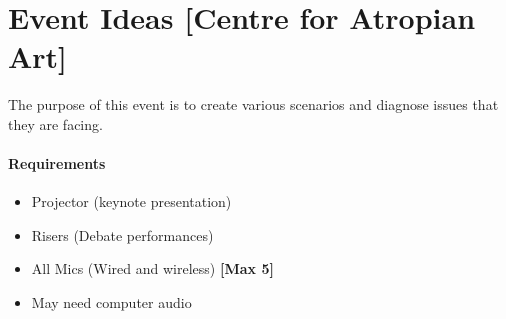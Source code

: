\section{Event Ideas [Centre for Atropian Art]}
\par The purpose of this event is to create various scenarios and diagnose issues 
that they are facing. 

\paragraph{Requirements}
\begin{itemize}
    \item Projector (keynote presentation)
    \item Risers (Debate performances)
    \item All Mics (Wired and wireless) \textbf{[Max 5]}
    \item May need computer audio
\end{itemize}


